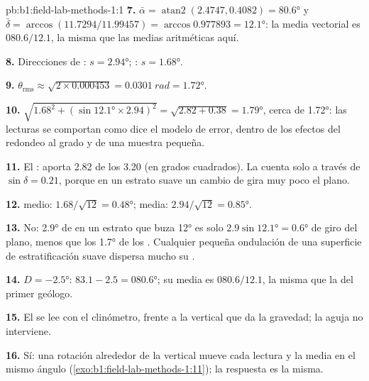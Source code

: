 \begin{solution}{pb:b1:field-lab-methods-1:1}
\textbf{7.} $\bar\alpha = \operatorname{atan2}(2.4747, 0.4082) = \ang{80.6}$ y
$\bar\delta = \arccos(11.7294/11.99457) = \arccos 0.977893 = \ang{12.1}$: la media vectorial es
$080.6/12.1$, la misma que las medias aritméticas aquí.

\textbf{8.} Direcciones de : $s = \ang{2.94}$; : $s = \ang{1.68}$.

\textbf{9.} $\theta_{\text{rms}} \approx \sqrt{2\times0.000453} =
\qty{0.0301}{rad} = \ang{1.72}$.

\textbf{10.} $\sqrt{1.68^2 + (\sin\ang{12.1}\times2.94)^2} = \sqrt{2.82 +
0.38} = \ang{1.79}$, cerca de \ang{1.72}: las lecturas se comportan como dice el modelo de error, dentro de
los efectos del redondeo al grado y de una muestra pequeña.

\textbf{11.} El : aporta 2.82 de los 3.20 (en grados cuadrados). La 
cuenta solo a través de $\sin\delta = 0.21$, porque en un estrato suave un cambio de  gira muy poco el plano.

\textbf{12.}  medio: $1.68/\sqrt{12} = \ang{0.48}$;  media:
$2.94/\sqrt{12} = \ang{0.85}$.

\textbf{13.} No: \ang{2.9} de  en un estrato que buza \ang{12} es solo
$2.9\sin\ang{12.1} = \ang{0.6}$ de giro del plano, menos que los \ang{1.7} de los . Cualquier
pequeña ondulación de una superficie de estratificación suave dispersa mucho su .

\textbf{14.} $D = \ang{-2.5}$: $83.1 - 2.5 = \ang{080.6}$; su media es $080.6/12.1$, la misma que la del
primer geólogo.

\textbf{15.} El  se lee con el clinómetro, frente a la vertical que da la gravedad; la aguja no
interviene.

\textbf{16.} Sí: una rotación alrededor de la vertical mueve cada lectura y la media en el mismo ángulo
(\cref{exo:b1:field-lab-methods-1:11}); la respuesta es la misma.


\end{solution}
